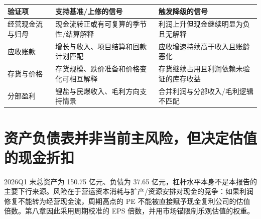 \begin{exhibitbox}[表 5-2：正式 H1 的现金质量评分卡]
\begin{tabularx}{\exhibitboxwidth}{L{3.4cm}X X}
\toprule
验证项 & 支持基准/上修的信号 & 触发降级的信号 \\
\midrule
经营现金流与归母 & 现金流转正或有可复算的季节性/结算解释 & 利润上升但现金继续明显为负且无解释 \\
应收账款 & 增长与收入、项目结算和回款计划匹配 & 应收增速持续高于收入且账龄恶化 \\
存货与价格 & 存货规模、跌价准备和价格变化可相互解释 & 存货继续占用且利润依赖未验证的库存收益 \\
分部盈利 & 锂盐与民爆收入、毛利方向支持情景 & 合并利润与分部收入/毛利逻辑不匹配 \\
\bottomrule
\end{tabularx}
\end{exhibitbox}

\section{资产负债表并非当前主风险，但决定估值的现金折扣}

2026Q1 末总资产为 150.75 亿元、负债为 37.65 亿元，杠杆水平本身不是本报告的主要下行来源。风险在于营运资本消耗与扩产/资源安排对现金的竞争：如果利润修复不能转为经营现金流，周期高点的 PE 不能被直接赋予现金复利公司的估值倍数。第八章因此采用周期校准的 EPS 倍数，并用市场锚限制乐观估值的权重。
